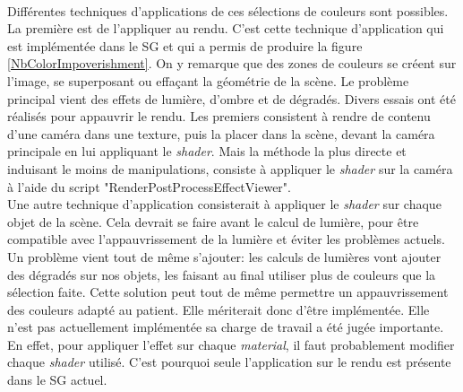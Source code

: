 		\begin{minipage}{\linewidth}
			\label{NbColorImpoverishment}
		\end{minipage}\medskip
		\\
		
		Différentes techniques d'applications de ces sélections de couleurs sont possibles. La première est de l'appliquer au rendu. C'est cette technique d'application qui est implémentée dans le SG et qui a permis de produire la figure \ref{NbColorImpoverishment}.
		On y remarque que des zones de couleurs se créent sur l'image, se superposant ou effaçant la géométrie de la scène. Le problème principal vient des effets de lumière, d'ombre et de dégradés.
		Divers essais ont été réalisés pour appauvrir le rendu. Les premiers consistent à rendre de contenu d'une caméra dans une texture, puis la placer dans la scène, devant la caméra principale en lui appliquant le \textit{shader}. Mais la méthode la plus directe et induisant le moins de manipulations, consiste à appliquer le \textit{shader} sur la caméra à l'aide du script "RenderPostProcessEffectViewer".
		\\
		
		Une autre technique d'application consisterait à appliquer le \textit{shader} sur chaque objet de la scène. Cela devrait se faire avant le calcul de lumière, pour être compatible avec l'appauvrissement de la lumière et éviter les problèmes actuels. Un problème vient tout de même s'ajouter: les calculs de lumières vont ajouter des dégradés sur nos objets, les faisant au final utiliser plus de couleurs que la sélection faite. Cette solution peut tout de même permettre un appauvrissement des couleurs adapté au patient. Elle mériterait donc d'être implémentée. Elle n'est pas actuellement implémentée sa charge de travail a été jugée importante. En effet, pour appliquer l'effet sur chaque \textit{material}, il faut probablement modifier chaque \textit{shader} utilisé. C'est pourquoi seule l'application sur le rendu est présente dans le SG actuel.
		
